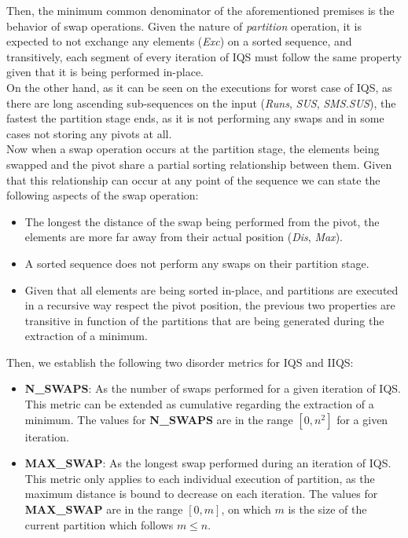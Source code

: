 Then, the minimum common denominator of the aforementioned premises is the behavior of swap operations. Given the nature of \textit{partition} operation, it is expected to not exchange any elements (\textit{Exc}) on a sorted sequence, and transitively, each segment of every iteration of IQS must follow the same property given that it is being performed in-place.\\

On the other hand, as it can be seen on the executions for worst case of IQS, as there are long ascending sub-sequences on the input (\textit{Runs}, \textit{SUS}, \textit{SMS.SUS}), the fastest the partition stage ends, as it is not performing any swaps and in some cases not storing any pivots at all.\\

Now when a swap operation occurs at the partition stage, the elements being swapped and the pivot share a partial sorting relationship between them. Given that this relationship can occur at any point of the sequence we can state the following aspects of the swap operation:\\

\begin{itemize}
    \item The longest the distance of the swap being performed from the pivot, the elements are more far away from their actual position (\textit{Dis}, \textit{Max}).
    \item A sorted sequence does not perform any swaps on their partition stage.
    \item Given that all elements are being sorted in-place, and partitions are executed in a recursive way respect the pivot position, the previous two properties are transitive in function of the partitions that are being generated during the extraction of a minimum.
\end{itemize}

Then, we establish the following two disorder metrics for IQS and IIQS:\\

\begin{itemize}
    \item \textbf{N\_SWAPS}: As the number of swaps performed for a given iteration of IQS. This metric can be extended as cumulative regarding the extraction of a minimum. The values for \textbf{N\_SWAPS} are in the range $[0, n^2]$ for a given iteration.
    \item \textbf{MAX\_SWAP}: As the longest swap performed during an iteration of IQS. This metric only applies to each individual execution of partition, as the maximum distance is bound to decrease on each iteration. The values for \textbf{MAX\_SWAP} are in the range $[0, m]$, on which $m$ is the size of the current partition which follows $m \leq n$.
\end{itemize}

